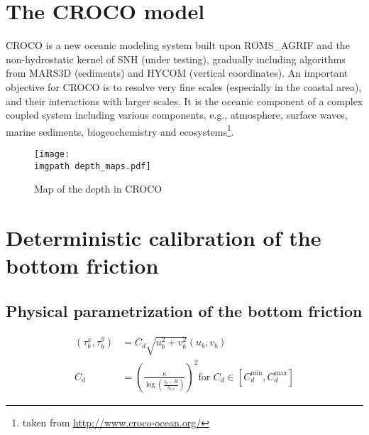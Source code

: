 \documentclass[../../Main_ManuscritThese.tex]{subfiles}
\newcommand\imgpath{/home/victor/acadwriting/Manuscrit/Text/Chapter5/img/}
\begin{document}
\label{chap:croco}
\minitoc
\newpage
\subfileLocal{\pagestyle{contentStyle}}

\section{The CROCO model}

CROCO is a new oceanic modeling system built upon ROMS\_AGRIF and the non-hydrostatic kernel of SNH (under testing), gradually including algorithms from MARS3D (sediments)  and HYCOM (vertical coordinates). An important objective for CROCO is to resolve very fine scales (especially in the coastal area), and their interactions with larger scales. It is the oceanic component of a complex coupled system including various components, e.g., atmosphere, surface waves, marine sediments, biogeochemistry and ecosystems\footnote{taken from \url{http://www.croco-ocean.org/}}.

\begin{figure}[ht]
  \centering
  \texttt{[image: \\imgpath depth\_maps.pdf]}
  \caption{\label{fig:depth_maps} Map of the depth in CROCO}
\end{figure}


\section{Deterministic calibration of the bottom friction}



\subsection{Physical parametrization of the bottom friction}
\begin{align}
  \label{eq:quadratic_friction_vonkarman}
  (\tau_b^x, \tau_b^y) &= C_d \sqrt{u_b^2 + v_b^2}(u_b, v_b) \\  
  C_d &= \left(\frac{\kappa}{\log\left(\frac{z_b - H}{z_{0,b}}\right)}\right)^2 \text{for } C_d \in [C_d^{\min}, C_d^{\max}]
\end{align}
\end{document}

